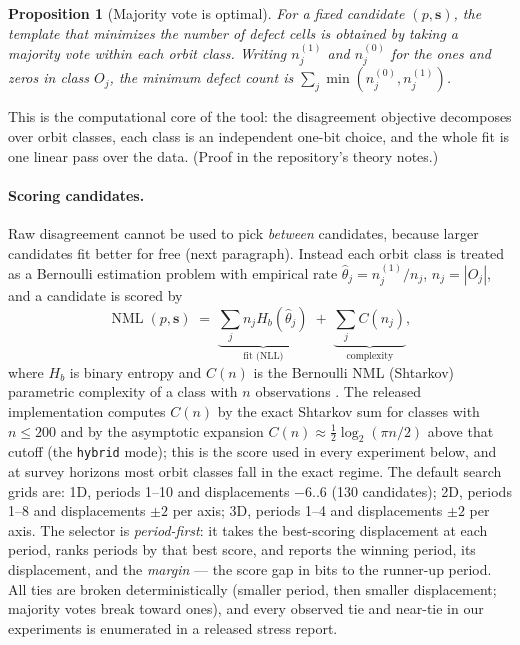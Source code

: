 \documentclass[letterpaper]{article}
\newtheorem{proposition}{Proposition}
\newcommand{\bs}{\mathbf{s}}
\newcommand{\NML}{\operatorname{NML}}
\newcommand{\Hb}{H_b}
\begin{document}
\begin{proposition}[Majority vote is optimal]
\label{prop:projection}
For a fixed candidate $(p,\bs)$, the template that minimizes the
number of defect cells is obtained by taking a majority vote within
each orbit class. Writing $n_j^{(1)}$ and $n_j^{(0)}$ for the ones and
zeros in class $O_j$, the minimum defect count is
$\sum_j \min(n_j^{(0)}, n_j^{(1)})$.
\end{proposition}

This is the computational core of the tool: the disagreement objective
decomposes over orbit classes, each class is an independent one-bit
choice, and the whole fit is one linear pass over the data. (Proof in
the repository's theory notes.)

\paragraph{Scoring candidates.}
Raw disagreement cannot be used to pick \emph{between} candidates,
because larger candidates fit better for free (next paragraph). Instead
each orbit class is treated as a Bernoulli estimation problem with
empirical rate $\hat{\theta}_j = n_j^{(1)}/n_j$, $n_j = |O_j|$, and a
candidate is scored by
\[
\NML(p,\bs) \;=\; \underbrace{\sum_j n_j \Hb(\hat{\theta}_j)}_{\text{fit
(NLL)}} \;+\; \underbrace{\sum_j C(n_j)}_{\text{complexity}},
\]
where $\Hb$ is binary entropy and $C(n)$ is the Bernoulli NML
(Shtarkov) parametric complexity of a class with $n$ observations
\citep{shtarkov1987,grunwald2007,grunwaldroos2019}. The released implementation computes
$C(n)$ by the exact Shtarkov sum for classes with $n \leq 200$ and by
the asymptotic expansion $C(n) \approx \tfrac{1}{2}\log_2(\pi n / 2)$
above that cutoff (the \texttt{hybrid} mode); this is the score used in
every experiment below, and at survey horizons most orbit classes fall
in the exact regime. The default search grids are: 1D, periods 1--10
and displacements $-6..6$ (130 candidates); 2D, periods 1--8 and
displacements $\pm 2$ per axis; 3D, periods 1--4 and displacements
$\pm 2$ per axis. The selector is \emph{period-first}: it takes the
best-scoring displacement at each period, ranks periods by that best
score, and reports the winning period, its displacement, and the
\emph{margin} --- the score gap in bits to the runner-up period. All
ties are broken deterministically (smaller period, then smaller
displacement; majority votes break toward ones), and every observed tie
and near-tie in our experiments is enumerated in a released stress
report.
\end{document}
